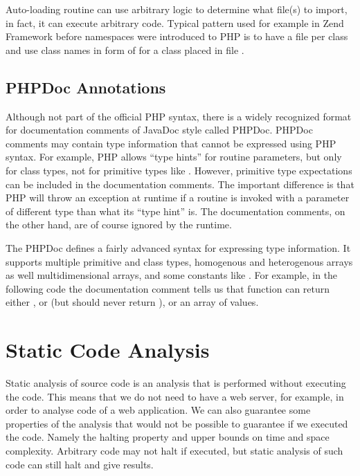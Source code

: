     Auto-loading routine can use arbitrary logic to 
    determine what file(s) to import, in fact, it can 
    execute arbitrary code. Typical 
    pattern used for example in 
    Zend Framework\cite{zendframework} before namespaces were 
    introduced to PHP is to have a file per class and use 
    class names in form of 
     for 
    a class placed in file 
    .
    
    \subsection{PHPDoc Annotations}
    Although not part of the official PHP syntax, 
    there is a widely recognized format for documentation 
    comments of JavaDoc style called PHPDoc. PHPDoc comments 
    may contain type information that cannot be expressed using 
    PHP syntax. For example, PHP allows ``type hints'' 
    for routine parameters, but only for class types, 
    not for primitive types like . However, 
    primitive type expectations can be included in the 
    documentation comments. The important difference 
    is that PHP will throw an exception at runtime if 
    a routine is invoked with a parameter of different 
    type than what its ``type hint'' is. The documentation
    comments, on the other hand, are of course ignored 
    by the runtime.
    
    The PHPDoc defines a fairly advanced syntax for expressing 
    type information. It supports multiple 
    primitive and class types, homogenous and heterogenous arrays as well 
    multidimensional arrays, and some constants like .
    For example, in the following code the documentation 
    comment tells us that function  can return 
    either , or  (but should never 
    return ), or an array of  values.
    
    
    \section{Static Code Analysis}       
        Static analysis of source code is an analysis that is performed without 
        executing the code. This means that we do not need to have a
        web server, for example, in order to analyse code of a web application. 
        We can also guarantee some properties of the analysis that would not 
        be possible to guarantee if we executed the code. Namely the halting property and 
        upper bounds on time and space complexity. Arbitrary code may not 
        halt if executed, but static analysis of such code can still halt 
        and give results.
        
